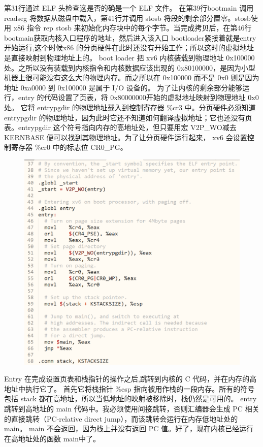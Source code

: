 \documentclass[a4paper,12pt]{report}
\begin{document}
第31行通过 ELF 头检查这是否的确是一个 ELF 文件。
在第39行bootmain 调用 readseg 将数据从磁盘中载入，第41行并调用 stosb 将段的剩余部分置零。stosb使用 x86 指令 rep stosb 来初始化内存块中的每个字节。当完成拷贝后，在第46行bootmain获取内核入口程序的地址，然后进入该入口
bootloader紧接着就是entry开始运行,这个时候x86 的分页硬件在此时还没有开始工作；所以这时的虚拟地址是直接映射到物理地址上的。
boot loader 把 xv6 内核装载到物理地址 0x100000 处。之所以没有装载到内核指令和内核数据应该出现的 0x80100000，是因为小型机器上很可能没有这么大的物理内存。而之所以在 0x100000 而不是 0x0 则是因为地址 0xa0000 到 0x100000 是属于 I/O 设备的。
为了让内核的剩余部分能够运行，entry 的代码设置了页表，将 0x80000000开始的虚拟地址映射到物理地址 0x0 处。
它将 entrypgdir 的物理地址载入到控制寄存器 \%cr3 中。分页硬件必须知道 entrypgdir 的物理地址，因为此时它还不知道如何翻译虚拟地址；它也还没有页表。entrypgdir 这个符号指向内存的高地址处，但只要用宏 V2P\_WO减去 KERNBASE 便可以找到其物理地址。为了让分页硬件运行起来， xv6 会设置控制寄存器 \%cr0 中的标志位 CR0\_PG。

\begin{figure}[H]
	\centering
	\includegraphics [width=1.0\textwidth]{figure//image96.png}
\end{figure}
Entry 在完成设置页表和栈指针的操作之后,跳转到内核的 C 代码，并在内存的高地址中执行它了。
首先它将栈指针 \%esp 指向被用作栈的一段内存。所有的符号包括 stack 都在高地址，所以当低地址的映射被移除时，栈仍然是可用的。
entry 跳转到高地址的 main 代码中。我必须使用间接跳转，否则汇编器会生成 PC 相关的直接跳转（PC-relative direct jump），而该跳转会运行在内存低地址处的 main。 main 不会返回，因为栈上并没有返回 PC 值。好了，现在内核已经运行在高地址处的函数 main中了。
\end{document}
